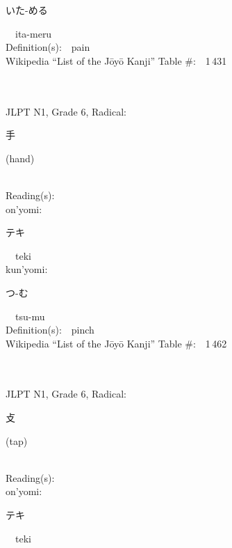 \begin{multicols}{2}
{\hspace*{2em}}{\begin{CJK}{UTF8}{min} いた-める \end{CJK}}\ \ ita-meru\ \ \\
Definition(s):\ \ pain \\
Wikipedia ``List of the J\=oy\=o Kanji'' Table \#:\ \ 1\,431 \\
\ \ \\
{\fontsize{34pt}{40pt}  }\ \ \\  %
{JLPT N1, Grade 6, Radical:\ \ {\begin{CJK}{UTF8}{min} 手 \end{CJK}} (hand) } \\
Reading(s):\ \ \\
{\hspace*{1em}}on'yomi:\ \ \\
{\hspace*{2em}}{\begin{CJK}{UTF8}{min} テキ \end{CJK}}\ \ teki\ \ \\
{\hspace*{1em}}kun'yomi:\ \ \\
{\hspace*{2em}}{\begin{CJK}{UTF8}{min} つ-む \end{CJK}}\ \ tsu-mu\ \ \\
Definition(s):\ \ pinch \\
Wikipedia ``List of the J\=oy\=o Kanji'' Table \#:\ \ 1\,462 \\
\ \ \\
{\fontsize{34pt}{40pt}  }\ \ \\  %
{JLPT N1, Grade 6, Radical:\ \ {\begin{CJK}{UTF8}{min} 攴 \end{CJK}} (tap) } \\
Reading(s):\ \ \\
{\hspace*{1em}}on'yomi:\ \ \\
{\hspace*{2em}}{\begin{CJK}{UTF8}{min} テキ \end{CJK}}\ \ teki\ \ \\

\end{multicols}
